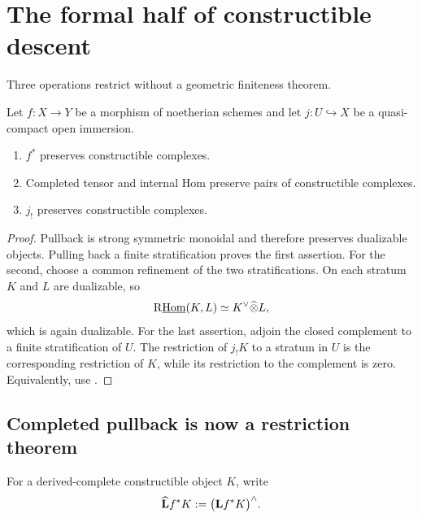 \section{The formal half of constructible descent}

Three operations restrict without a geometric finiteness theorem.

\begin{proposition}
\label{prop:formal-constructible-preservation}
Let \(f:X\to Y\) be a morphism of noetherian schemes and let
\(j:U\hookrightarrow X\) be a quasi-compact open immersion.
\begin{enumerate}
\item \(f^*\) preserves constructible complexes.
\item Completed tensor and internal Hom preserve pairs of constructible
      complexes.
\item \(j_!\) preserves constructible complexes.
\end{enumerate}
\end{proposition}

\begin{proof}
Pullback is strong symmetric monoidal and therefore preserves dualizable
objects.  Pulling back a finite stratification proves the first assertion.
For the second, choose a common refinement of the two stratifications.  On
each stratum \(K\) and \(L\) are dualizable, so
\[
 \mathrm R\underline{\operatorname{Hom}}(K,L)
   \simeq K^\vee\widehat\otimes L,
\]
which is again dualizable.  For the last assertion, adjoin the closed
complement to a finite stratification of \(U\).  The restriction of \(j_!K\)
to a stratum in \(U\) is the corresponding restriction of \(K\), while its
restriction to the complement is zero.  Equivalently, use
\cite[Corollary~4.6]{HRSConstructible}.
\end{proof}

\subsection{Completed pullback is now a restriction theorem}

\begin{definition}
\label{def:completed-pullback}
For a derived-complete constructible object \(K\), write
\begin{equation}
\label{eq:completed-pullback}
 \widehat{\mathbf L} f^*K:=\bigl(\mathbf Lf^*K\bigr)^\wedge.
\end{equation}
\end{definition}

